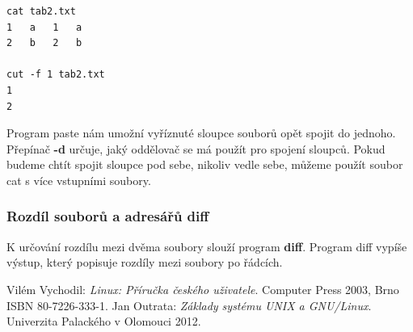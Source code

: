 \documentclass{article}
\begin{document}
\begin{verbatim}
cat tab2.txt
1	a	1	a
2	b	2	b 
	
cut -f 1 tab2.txt
1
2
\end{verbatim}

Program paste nám umožní vyříznuté sloupce souborů opět spojit do jednoho. Přepínač \textbf{-d} určuje, jaký oddělovač se má použít pro spojení sloupců. Pokud budeme chtít spojit sloupce pod sebe, nikoliv vedle sebe, můžeme použít soubor cat s více vstupními soubory.


\subsubsection{Rozdíl souborů a adresářů diff}
K určování rozdílu mezi dvěma soubory slouží program \textbf{diff}. Program diff vypíše výstup, který popisuje rozdíly mezi soubory po řádcích. 


\newpage
\begin{thebibliography}{0}
  Vilém Vychodil: \emph{Linux: Příručka českého uživatele}. Computer Press 2003, Brno ISBN 80-7226-333-1. 
  Jan Outrata: \emph{Základy systému UNIX a GNU/Linux}. Univerzita Palackého v Olomouci 2012.
  
\end{thebibliography}
\end{document}
